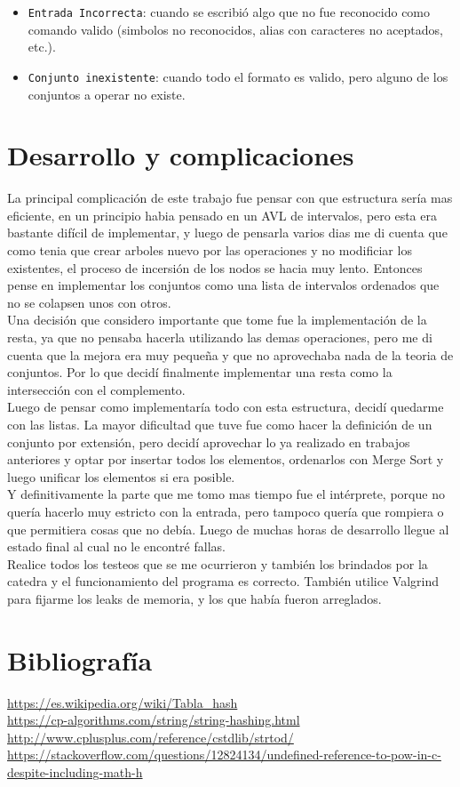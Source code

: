 \documentclass[]{article}
\begin{document}
\begin{itemize}
	\item \verb|Entrada Incorrecta|: cuando se escribió algo que no fue reconocido como comando valido (simbolos no reconocidos, alias con caracteres no aceptados, etc.).
	\item \verb|Conjunto inexistente|: cuando todo el formato es valido, pero alguno de los conjuntos a operar no existe.
\end{itemize}
\section{Desarrollo y complicaciones}
La principal complicación de este trabajo fue pensar con que estructura sería mas eficiente, en un principio habia pensado en un AVL de intervalos, pero esta era bastante difícil de implementar, y luego de pensarla varios dias me di cuenta que como tenia que crear arboles nuevo por las operaciones y no modificiar los existentes, el proceso de incersión de los nodos se hacia muy lento. Entonces pense en implementar los conjuntos como una lista de intervalos ordenados que no se colapsen unos con otros.
\\Una decisión que considero importante que tome fue la implementación de la resta, ya que no pensaba hacerla utilizando las demas operaciones, pero me di cuenta que la mejora era muy pequeña y que no aprovechaba nada de la teoria de conjuntos. Por lo que decidí finalmente implementar una resta como la intersección con el complemento.
\\Luego de pensar como implementaría todo con esta estructura, decidí quedarme con las listas. La mayor dificultad que tuve fue como hacer la definición de un conjunto por extensión, pero decidí aprovechar lo ya realizado en trabajos anteriores y optar por insertar todos los elementos, ordenarlos con Merge Sort y luego unificar los elementos si era posible.
\\Y definitivamente la parte que me tomo mas tiempo fue el intérprete, porque no quería hacerlo muy estricto con la entrada, pero tampoco quería que rompiera o que permitiera cosas que no debía. Luego de muchas horas de desarrollo llegue al estado final al cual no le encontré fallas.
\\Realice todos los testeos que se me ocurrieron y también los brindados por la catedra y el funcionamiento del programa es correcto. También utilice Valgrind para fijarme los leaks de memoria, y los que había fueron arreglados.
\newpage
\section{Bibliografía}
\url{https://es.wikipedia.org/wiki/Tabla_hash}\\
\url{https://cp-algorithms.com/string/string-hashing.html}\\
\url{http://www.cplusplus.com/reference/cstdlib/strtod/}\\
\url{https://stackoverflow.com/questions/12824134/undefined-reference-to-pow-in-c-despite-including-math-h}\\
\end{document}
